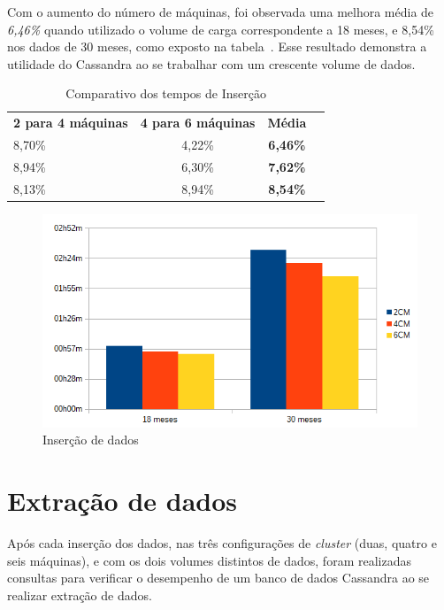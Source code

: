 Com o aumento do número de máquinas, foi observada uma melhora média de \emph{6,46\%} quando utilizado o volume de carga correspondente a 18 meses, e {8,54\%} nos dados de 30 meses, como exposto na tabela~\cite{tb:comparativo_insert}. Esse resultado demonstra a utilidade do Cassandra ao se trabalhar com um crescente volume de dados.

\begin{table}[]
	\centering
	\caption{Comparativo dos tempos de Inserção}
	\label{tb:comparativo_insert}
	\begin{tabular}{|l|c|c|l}
		\cline{1-3}
		\textbf{2 para 4 máquinas} & \textbf{4 para 6 máquinas} & \textbf{Média}  &  \\ \cline{1-3}
		8,70\%                     & 4,22\%                     & \textbf{6,46\%} &  \\ \cline{1-3}
		8,94\%                     & 6,30\%                     & \textbf{7,62\%} &  \\ \cline{1-3}
		8,13\%                     & 8,94\%                     & \textbf{8,54\%} &  \\ \cline{1-3}
	\end{tabular}
\end{table}

\begin{figure}[!htb]
	\centering
	\includegraphics[width=1\textwidth]{figuras/graphinsert.png}
	\caption{Inserção de dados}
	\label{fig:graph_insert}
\end{figure}

\section{Extração de dados}
Após cada inserção dos dados, nas três configurações de \emph{cluster} (duas, quatro e seis máquinas), e com os dois volumes distintos de dados, foram realizadas consultas para verificar o desempenho de um banco de dados Cassandra ao se realizar extração de dados.

